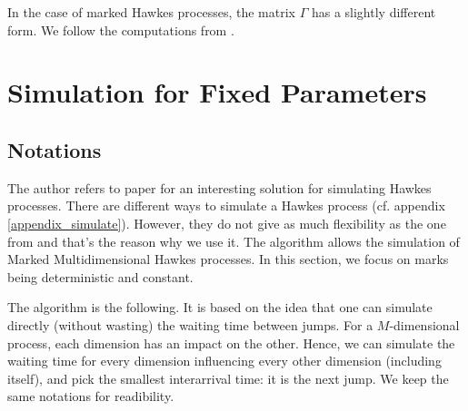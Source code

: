 \documentclass[11pt]{book}
\begin{document}
In the case of marked Hawkes processes, the matrix $\Gamma$ has a slightly different form. We follow the computations from \cite{my_algo_simul}.




\section{Simulation for Fixed Parameters}
\subsection{Notations}

The author refers to paper \cite{my_algo_simul} for an interesting solution for simulating Hawkes processes. There are different ways to simulate a Hawkes process (cf. appendix \ref{appendix_simulate}). However, they do not give as much flexibility as the one from \cite{my_algo_simul} and that's the reason why we use it. The algorithm allows the simulation of Marked Multidimensional Hawkes processes. In this section, we focus on marks being deterministic and constant.


The algorithm is the following. It is based on the idea that one can simulate directly (without wasting) the waiting time between jumps. For a $M$-dimensional process, each dimension has an impact on the other. Hence, we can simulate the waiting time for every dimension influencing every other dimension (including itself), and pick the smallest interarrival time: it is the next jump. We keep the same notations for readibility.
\end{document}
